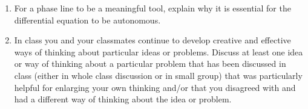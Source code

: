 \begin{enumerate}
\item For a phase line to be a meaningful tool, explain why it is essential for the differential equation to be autonomous. \label{06HWproblem5}

\item In class you and your classmates continue to develop creative and effective ways of thinking about particular ideas or problems. Discuss at least one idea or way of thinking about a particular problem that has been discussed in class (either in whole class discussion or in small group) that was particularly helpful for enlarging your own thinking and/or that you disagreed with and had a different way of thinking about the idea or problem. \label{06HWproblem6}

\end{enumerate}